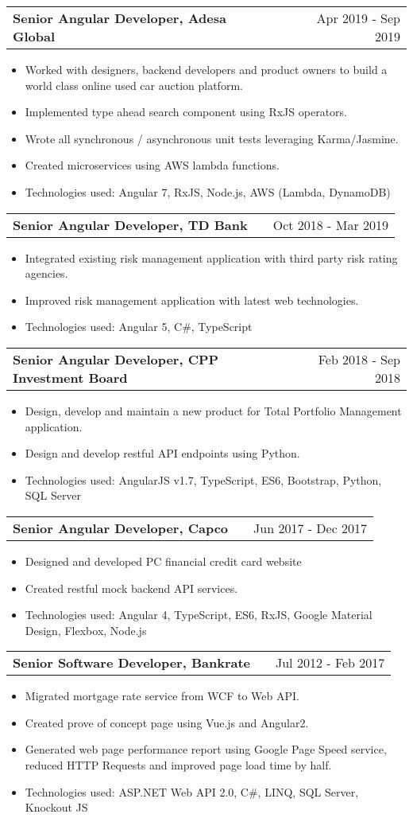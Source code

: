 \documentclass[a4paper,12pt]{article}
\makeatletter
\newenvironment{joblong}[2]
    {
    \begin{tabularx}{\linewidth}{@{}l X r@{}}
    \textbf{#1} & \hfill &  #2 \\[3.75pt]
    \end{tabularx}
    \begin{minipage}[t]{\linewidth}
    \begin{itemize}[nosep,after=\strut, leftmargin=1em, itemsep=3pt,label=--]
    }
    {
    \end{itemize}
    \end{minipage}    
    }
\makeatother
\begin{document}
\begin{joblong}{Senior Angular Developer, Adesa Global}{Apr 2019 - Sep 2019}
\item Worked with designers, backend developers and product owners to build a world class online used car auction platform.
\item Implemented type ahead search component using RxJS operators. 
\item Wrote all synchronous / asynchronous unit tests leveraging Karma/Jasmine.
\item Created microservices using AWS lambda functions.
\item Technologies used:  Angular 7, RxJS, Node.js, AWS (Lambda, DynamoDB)
\end{joblong}

\begin{joblong}{Senior Angular Developer, TD Bank}{Oct 2018 - Mar 2019}
\item Integrated existing risk management application with third party risk rating agencies.
\item Improved risk management application with latest web technologies.
\item Technologies used:  Angular 5, C\#, TypeScript
\end{joblong}

\begin{joblong}{Senior Angular Developer, CPP Investment Board}{Feb 2018 - Sep 2018}
\item Design, develop and maintain a new product for Total Portfolio Management application.
\item Design and develop restful API endpoints using Python. 
\item Technologies used: AngularJS v1.7, TypeScript, ES6, Bootstrap, Python, SQL Server
\end{joblong}

\begin{joblong}{Senior Angular Developer, Capco}{Jun 2017 - Dec 2017}
\item Designed and developed PC financial credit card website 
\item Created restful mock backend API services. 
\item Technologies used: Angular 4, TypeScript, ES6, RxJS, Google Material Design, Flexbox, Node.js
\end{joblong}

\begin{joblong}{Senior Software Developer, Bankrate}{Jul 2012 - Feb 2017}
\item Migrated mortgage rate service from WCF to Web API.
\item Created prove of concept page using Vue.js and Angular2. 
\item Generated web page performance report using Google Page Speed service, reduced HTTP Requests and improved page load time by half.
\item Technologies used: ASP.NET Web API 2.0, C\#, LINQ, SQL Server, Knockout JS
\end{joblong}
\end{document}
